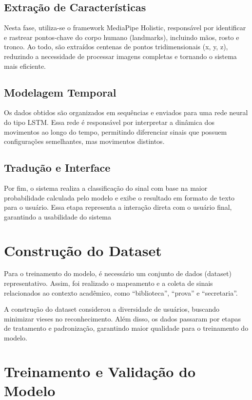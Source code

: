 \subsection{Extração de Características}

Nesta fase, utiliza-se o framework MediaPipe Holistic, responsável por identificar e rastrear pontos-chave do corpo humano (landmarks), incluindo mãos, rosto e tronco. Ao todo, são extraídos centenas de pontos tridimensionais (x, y, z), reduzindo a necessidade de processar imagens completas e tornando o sistema mais eficiente.

\subsection{Modelagem Temporal}

Os dados obtidos são organizados em sequências e enviados para uma rede neural do tipo LSTM. Essa rede é responsável por interpretar a dinâmica dos movimentos ao longo do tempo, permitindo diferenciar sinais que possuem configurações semelhantes, mas movimentos distintos.

\subsection{Tradução e Interface}

Por fim, o sistema realiza a classificação do sinal com base na maior probabilidade calculada pelo modelo e exibe o resultado em formato de texto para o usuário. Essa etapa representa a interação direta com o usuário final, garantindo a usabilidade do sistema

\section{Construção do Dataset}

Para o treinamento do modelo, é necessário um conjunto de dados (dataset) representativo. Assim, foi realizado o mapeamento e a coleta de sinais relacionados ao contexto acadêmico, como “biblioteca”, “prova” e “secretaria”.

A construção do dataset considerou a diversidade de usuários, buscando minimizar vieses no reconhecimento. Além disso, os dados passaram por etapas de tratamento e padronização, garantindo maior qualidade para o treinamento do modelo.

\section{Treinamento e Validação do Modelo}

